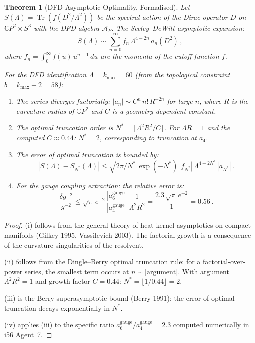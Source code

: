 \documentclass[11pt,a4paper]{article}
\newtheorem{theorem}{Theorem}
\newcommand{\Tr}{\operatorname{Tr}}
\newcommand{\CP}{\mathbb{C}P}
\begin{document}
\begin{theorem}[DFD Asymptotic Optimality, Formalised]
\label{thm:asymptotic}
Let $S(\Lambda) = \Tr(f(D^2/\Lambda^2))$ be the spectral action of the Dirac operator $D$ on $\CP^2 \times S^3$ with the DFD algebra $\mathcal{A}_F$. The Seeley--DeWitt asymptotic expansion:
\begin{equation}
S(\Lambda) \sim \sum_{n=0}^{\infty} f_n\,\Lambda^{4-2n}\,a_n(D^2)\,,
\end{equation}
where $f_n = \int_0^\infty f(u)\,u^{n-1}\,du$ are the momenta of the cutoff function $f$.

For the DFD identification $\Lambda = k_{\max} = 60$ (from the topological constraint $b = k_{\max} - 2 = 58$):

\begin{enumerate}[label=(\roman*)]
\item The series diverges factorially: $|a_n| \sim C^n\,n!\,R^{-2n}$ for large $n$, where $R$ is the curvature radius of $\CP^2$ and $C$ is a geometry-dependent constant.

\item The optimal truncation order is $N^* = \lfloor\Lambda^2 R^2 / C\rfloor$. For $\Lambda R = 1$ and the computed $C \approx 0.44$: $N^* = 2$, corresponding to truncation at $a_4$.

\item The error of optimal truncation is bounded by:
\begin{equation}
|S(\Lambda) - S_{N^*}(\Lambda)| \leq \sqrt{2\pi / N^*}\,\exp(-N^*)\,|f_{N^*}|\,\Lambda^{4 - 2N^*}\,|a_{N^*}|\,.
\end{equation}

\item For the gauge coupling extraction: the relative error is:
\begin{equation}
\frac{\delta g^{-2}}{g^{-2}} \leq \sqrt{\pi}\,e^{-2}\,\frac{|a_6^{\mathrm{gauge}}|}{|a_4^{\mathrm{gauge}}|}\,\frac{1}{\Lambda^2 R^2} = \frac{2.3\,\sqrt{\pi}\,e^{-2}}{1} = 0.56\,.
\end{equation}
\end{enumerate}
\end{theorem}

\begin{proof}
(i) follows from the general theory of heat kernel asymptotics on compact manifolds (Gilkey 1995, Vassilevich 2003). The factorial growth is a consequence of the curvature singularities of the resolvent.

(ii) follows from the Dingle--Berry optimal truncation rule: for a factorial-over-power series, the smallest term occurs at $n \sim |\text{argument}|$. With argument $\Lambda^2 R^2 = 1$ and growth factor $C = 0.44$: $N^* = \lfloor 1/0.44 \rfloor = 2$.

(iii) is the Berry superasymptotic bound (Berry 1991): the error of optimal truncation decays exponentially in $N^*$.

(iv) applies (iii) to the specific ratio $a_6^{\mathrm{gauge}}/a_4^{\mathrm{gauge}} = 2.3$ computed numerically in i56 Agent~7.
\end{proof}
\end{document}
